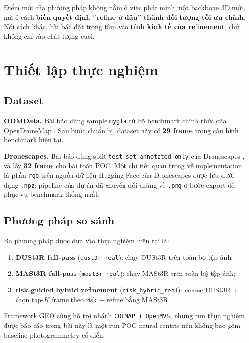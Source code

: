 \documentclass[11pt,a4paper]{article}
\begin{document}
Điểm mới của phương pháp không nằm ở việc phát minh một backbone 3D mới, mà ở cách \textbf{biến quyết định ``refine ở đâu'' thành đối tượng tối ưu chính}. Nói cách khác, bài báo đặt trọng tâm vào \textbf{tính kinh tế của refinement}, chứ không chỉ vào chất lượng cuối.

\section{Thiết lập thực nghiệm}

\subsection{Dataset}

\textbf{ODMData.} Bài báo dùng sample \texttt{mygla} từ bộ benchmark chính thức của OpenDroneMap \citep{ODMDataBenchmarks}. Sau bước chuẩn bị, dataset này có \textbf{29 frame} trong cấu hình benchmark hiện tại.

\textbf{Dronescapes.} Bài báo dùng split \texttt{test\_set\_annotated\_only} của Dronescapes \citep{DronescapesDataset}, và lấy \textbf{32 frame} cho bài toán POC. Một chi tiết quan trọng về implementation là phần \texttt{rgb} trên nguồn dữ liệu Hugging Face của Dronescapes được lưu dưới dạng \texttt{.npz}; pipeline của dự án đã chuyển đổi chúng về \texttt{.png} ở bước export để phục vụ benchmark thống nhất.

\subsection{Phương pháp so sánh}

Ba phương pháp được đưa vào thực nghiệm hiện tại là:
\begin{enumerate}[leftmargin=1.5em]
  \item \textbf{DUSt3R full-pass} (\texttt{dust3r\_real}): chạy DUSt3R trên toàn bộ tập ảnh;
  \item \textbf{MASt3R full-pass} (\texttt{mast3r\_real}): chạy MASt3R trên toàn bộ tập ảnh;
  \item \textbf{risk-guided hybrid refinement} (\texttt{risk\_hybrid\_real}): coarse DUSt3R + chọn top-$K$ frame theo risk + refine bằng MASt3R.
\end{enumerate}

Framework GEO cũng hỗ trợ nhánh \texttt{COLMAP + OpenMVS}, nhưng run thực nghiệm được báo cáo trong bài này là một run POC neural-centric nên không bao gồm baseline photogrammetry cổ điển.
\end{document}
